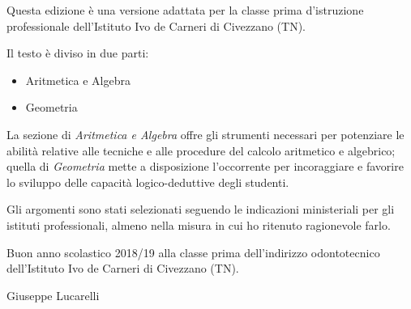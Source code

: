 Questa edizione è una versione adattata per la classe prima d'istruzione professionale dell'Istituto Ivo de Carneri di Civezzano (TN).

Il testo è diviso in due parti:
\begin{itemize}
  \item Aritmetica e Algebra
  \item Geometria
\end{itemize}
La sezione di \emph{Aritmetica e Algebra} offre gli strumenti necessari per potenziare le abilità relative alle tecniche e alle procedure del calcolo aritmetico e algebrico; quella di \emph{Geometria} mette a disposizione l'occorrente per incoraggiare e favorire lo sviluppo delle capacità logico-deduttive degli studenti.

Gli argomenti sono stati selezionati seguendo le indicazioni ministeriali per gli istituti professionali, almeno nella misura in cui ho ritenuto ragionevole farlo.

Buon anno scolastico 2018/19 alla classe prima dell'indirizzo odontotecnico dell'Istituto Ivo de Carneri di Civezzano (TN).

\begin{flushright}
Giuseppe Lucarelli
\end{flushright}


